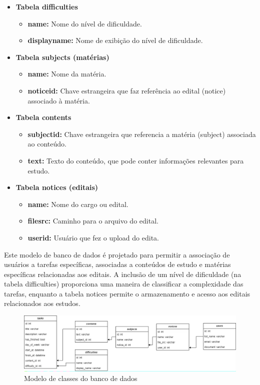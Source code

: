 \begin{itemize}
    \item \textbf{Tabela difficulties}
    
    \begin{itemize}
    \item \textbf{name:} Nome do nível de dificuldade.
    \item \textbf{displayname:} Nome de exibição do nível de dificuldade.
    \end{itemize}
    
    \item \textbf{Tabela subjects (matérias)}
    \begin{itemize}
    \item \textbf{name:} Nome da matéria.
    \item \textbf{noticeid:} Chave estrangeira que faz referência ao edital (notice) associado à matéria.
    \end{itemize}
    
    \item \textbf{Tabela contents}
    \begin{itemize}
    \item \textbf{subjectid:} Chave estrangeira que referencia a matéria (subject) associada ao conteúdo. 
    \item \textbf{text:} Texto do conteúdo, que pode conter informações relevantes para estudo.
    \end{itemize}
    
    \item \textbf{Tabela notices (editais)}
    \begin{itemize}
    \item \textbf{name:} Nome do cargo ou edital.
    \item \textbf{filesrc:} Caminho para o arquivo do edital. 
    \item \textbf{userid:} Usuário que fez o upload do edita.
    \end{itemize}
    
\end{itemize}

Este modelo de banco de dados é projetado para permitir a associação de usuários a tarefas específicas, associadas a conteúdos de estudo e matérias específicas relacionadas aos editais. A inclusão de um nível de dificuldade (na tabela difficulties) proporciona uma maneira de classificar a complexidade das tarefas, enquanto a tabela notices permite o armazenamento e acesso aos editais relacionados aos estudos.

 \begin{figure}[!htb]
 	    \centering
 	    \caption{\label{logo}Modelo de classes do banco de dados}
 	    \includegraphics[width=15cm]{img/db-model.png}
\end{figure}
\FloatBarrier

